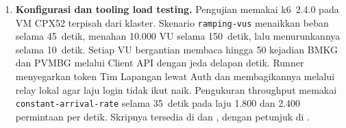 \begin{enumerate}
\item \textbf{Konfigurasi dan tooling load testing.} Pengujian memakai k6~2.4.0 pada VM CPX52 terpisah dari klaster. Skenario \texttt{ramping-vus} menaikkan beban selama 45~detik, menahan 10.000 VU selama 150~detik, lalu menurunkannya selama 10~detik. Setiap VU bergantian membaca hingga 50 kejadian BMKG dan PVMBG melalui Client API dengan jeda delapan detik. Runner menyegarkan token Tim Lapangan lewat Auth dan membagikannya melalui relay lokal agar laju login tidak ikut naik. Pengukuran throughput memakai \texttt{constant-arrival-rate} selama 35~detik pada laju 1.800 dan 2.400 permintaan per detik. Skripnya tersedia di  dan , dengan petunjuk di  \cite{k6}.
\end{enumerate}
